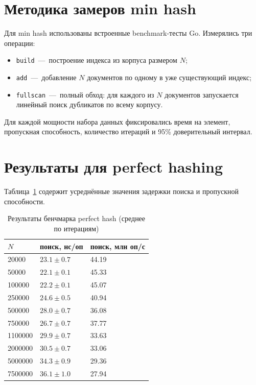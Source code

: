 \documentclass{itmo}
\begin{document}
\section{Методика замеров min hash}

Для min hash использованы встроенные benchmark-тесты Go.
Измерялись три операции:
\begin{itemize}
	\item \texttt{build}~---~построение индекса из корпуса размером $N$;
	\item \texttt{add}~---~добавление $N$ документов по одному в уже существующий индекс;
	\item \texttt{fullscan}~---~полный обход: для каждого из $N$ документов запускается линейный поиск дубликатов по всему корпусу.
\end{itemize}

Для каждой мощности набора данных фиксировались время на элемент, пропускная способность, количество итераций и 95\% доверительный интервал.

\section{Результаты для perfect hashing}

Таблица~\ref{tab:perfect-bench} содержит усреднённые значения задержки поиска и пропускной способности.
\begin{table}[h]
	\centering
	\caption{Результаты бенчмарка perfect hash (среднее по итерациям)}
	\label{tab:perfect-bench}
	\begin{tabularx}{\textwidth}{|X|X|X|}
		\toprule
		$N$ & поиск, нс/оп & поиск, млн оп/с \\
		\midrule
		20000 & $23.1 \pm 0.7$ & 44.19 \\
		50000 & $22.1 \pm 0.1$ & 45.33 \\
		100000 & $22.2 \pm 0.1$ & 45.07 \\
		250000 & $24.6 \pm 0.5$ & 40.94 \\
		500000 & $28.0 \pm 0.7$ & 36.08 \\
		750000 & $26.7 \pm 0.7$ & 37.77 \\
		1100000 & $29.9 \pm 0.7$ & 33.63 \\
		2000000 & $30.5 \pm 0.7$ & 33.06 \\
		5000000 & $34.3 \pm 0.9$ & 29.36 \\
		7500000 & $36.1 \pm 1.0$ & 27.94 \\
		\bottomrule
	\end{tabularx}
\end{table}
\end{document}
